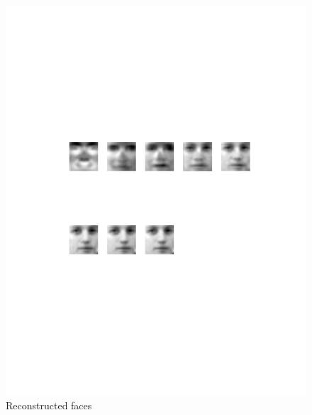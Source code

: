 \documentclass[a4paper,twoside=false,abstract=false,numbers=noenddot,
titlepage=false,headings=small,parskip=half,version=last]{scrartcl}
\theoremstyle{definition}
\theoremstyle{remark}
\begin{document}
\begin{figure}[t]
    \begin{center}
        \includegraphics[width=1.0\textwidth]{../Result_Pics/Reconstruct/rim.pdf}
    \end{center}
    \caption{Reconstructed faces}
    \label{fig:reconstruct}
\end{figure}
\end{document}
